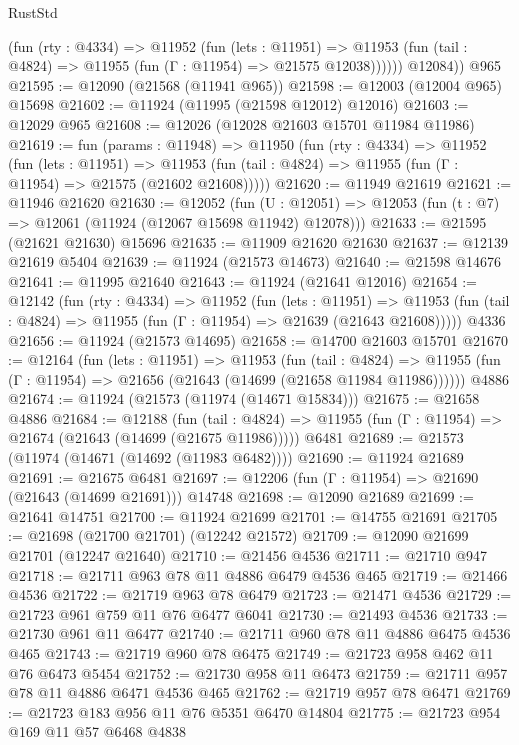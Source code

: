 \begin{lexlean}{RustStd}
\begin{coremodule}
            (fun (rty : @4334) =>
            @11952
              (fun (lets : @11951) =>
              @11953 (fun (tail : @4824) => @11955 (fun (Γ : @11954) => @21575 @12038))))))
        @12084))
    @965
@21595 := @12090 (@21568 (@11941 @965))
@21598 := @12003 (@12004 @965) @15698
@21602 := @11924 (@11995 (@21598 @12012) @12016)
@21603 := @12029 @965
@21608 := @12026 (@12028 @21603 @15701 @11984 @11986)
@21619 := fun (params : @11948) =>
  @11950
    (fun (rty : @4334) =>
    @11952
      (fun (lets : @11951) =>
      @11953 (fun (tail : @4824) => @11955 (fun (Γ : @11954) => @21575 (@21602 @21608)))))
@21620 := @11949 @21619
@21621 := @11946 @21620
@21630 := @12052
    (fun (U : @12051) => @12053 (fun (t : @7) => @12061 (@11924 (@12067 @15698 @11942) @12078)))
@21633 := @21595 (@21621 @21630) @15696
@21635 := @11909 @21620 @21630
@21637 := @12139 @21619 @5404
@21639 := @11924 (@21573 @14673)
@21640 := @21598 @14676
@21641 := @11995 @21640
@21643 := @11924 (@21641 @12016)
@21654 := @12142
    (fun (rty : @4334) =>
    @11952
      (fun (lets : @11951) =>
      @11953 (fun (tail : @4824) => @11955 (fun (Γ : @11954) => @21639 (@21643 @21608)))))
    @4336
@21656 := @11924 (@21573 @14695)
@21658 := @14700 @21603 @15701
@21670 := @12164
    (fun (lets : @11951) =>
    @11953
      (fun (tail : @4824) =>
      @11955 (fun (Γ : @11954) => @21656 (@21643 (@14699 (@21658 @11984 @11986))))))
    @4886
@21674 := @11924 (@21573 (@11974 (@14671 @15834)))
@21675 := @21658 @4886
@21684 := @12188
    (fun (tail : @4824) => @11955 (fun (Γ : @11954) => @21674 (@21643 (@14699 (@21675 @11986)))))
    @6481
@21689 := @21573 (@11974 (@14671 (@14692 (@11983 @6482))))
@21690 := @11924 @21689
@21691 := @21675 @6481
@21697 := @12206 (fun (Γ : @11954) => @21690 (@21643 (@14699 @21691))) @14748
@21698 := @12090 @21689
@21699 := @21641 @14751
@21700 := @11924 @21699
@21701 := @14755 @21691
@21705 := @21698 (@21700 @21701) (@12242 @21572)
@21709 := @12090 @21699 @21701 (@12247 @21640)
@21710 := @21456 @4536
@21711 := @21710 @947
@21718 := @21711 @963 @78 @11 @4886 @6479 @4536 @465
@21719 := @21466 @4536
@21722 := @21719 @963 @78 @6479
@21723 := @21471 @4536
@21729 := @21723 @961 @759 @11 @76 @6477 @6041
@21730 := @21493 @4536
@21733 := @21730 @961 @11 @6477
@21740 := @21711 @960 @78 @11 @4886 @6475 @4536 @465
@21743 := @21719 @960 @78 @6475
@21749 := @21723 @958 @462 @11 @76 @6473 @5454
@21752 := @21730 @958 @11 @6473
@21759 := @21711 @957 @78 @11 @4886 @6471 @4536 @465
@21762 := @21719 @957 @78 @6471
@21769 := @21723 @183 @956 @11 @76 @5351 @6470 @14804
@21775 := @21723 @954 @169 @11 @57 @6468 @4838

\end{coremodule}
\end{lexlean}
